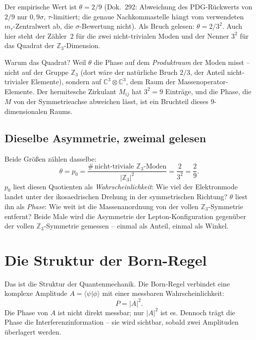 Der empirische Wert ist $\theta = 2/9$ (Dok.~292: Abweichung des PDG-Rückwerts von $2/9$
nur $0{,}9\sigma$, $\tau$-limitiert; die genaue Nachkommastelle hängt vom verwendeten
$m_\tau$-Zentralwert ab, die $\sigma$-Bewertung nicht). Als Bruch gelesen: $\theta = 2/3^2$. Auch hier
steht der Zähler~$2$ für die zwei nicht-trivialen Moden und der Nenner $3^2$ für das Quadrat der
$\mathbb{Z}_3$-Dimension.

Warum das Quadrat? Weil $\theta$ die Phase auf dem \emph{Produktraum} der Moden misst -- nicht
auf der Gruppe $\mathbb{Z}_3$ (dort wäre der natürliche Bruch $2/3$, der Anteil nicht-trivialer
Elemente), sondern auf $\mathbb{C}^3 \otimes \mathbb{C}^3$, dem Raum der Massenoperator-Elemente.
Der hermitesche Zirkulant $M_{ij}$ hat $3^2 = 9$ Einträge, und die Phase, die $M$ von der
Symmetrieachse abweichen lässt, ist ein Bruchteil dieses $9$-dimensionalen Raums.

\subsection{Dieselbe Asymmetrie, zweimal gelesen}

Beide Größen zählen dasselbe:
\begin{equation}\label{eq:quotient}
  \theta = p_0 = \frac{\#\,\text{nicht-triviale }\mathbb{Z}_3\text{-Moden}}{|\mathbb{Z}_3|^2}
  = \frac{2}{3^2} = \frac{2}{9}.
\end{equation}
$p_0$ liest diesen Quotienten als \emph{Wahrscheinlichkeit}: Wie viel der Elektronmode landet
unter der ikosaedrischen Drehung in der symmetrischen Richtung? $\theta$ liest ihn als
\emph{Phase}: Wie weit ist die Massenanordnung von der vollen $\mathbb{Z}_3$-Symmetrie entfernt?
Beide Male wird die Asymmetrie der Lepton-Konfiguration gegenüber der vollen
$\mathbb{Z}_3$-Symmetrie gemessen -- einmal als Anteil, einmal als Winkel.

\section{Die Struktur der Born-Regel}

Das ist die Struktur der Quantenmechanik. Die Born-Regel \EM{} verbindet eine komplexe Amplitude
$A = \langle\psi|\phi\rangle$ mit einer messbaren Wahrscheinlichkeit:
\[
  P = |A|^2.
\]
Die Phase von $A$ ist nicht direkt messbar; nur $|A|^2$ ist es. Dennoch trägt die Phase die
Interferenzinformation -- sie wird sichtbar, sobald zwei Amplituden überlagert werden.


